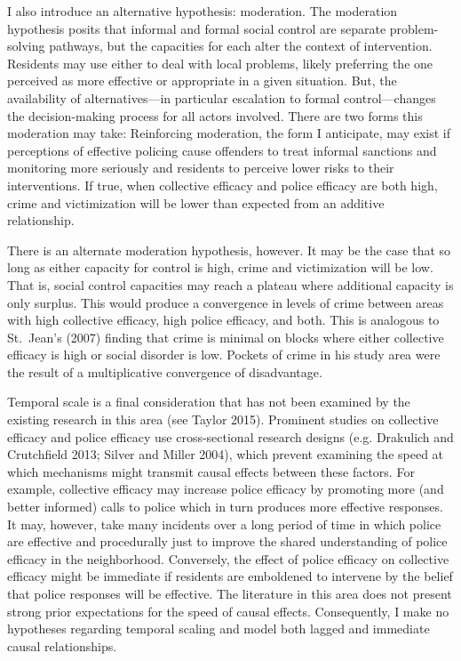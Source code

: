 \documentclass [11pt, proquest] {uwthesis}[2015/03/03]
\begin{document}
I also introduce an alternative hypothesis: moderation. The moderation hypothesis posits that informal and formal social control are separate problem-solving pathways, but the capacities for each alter the context of intervention. Residents may use either to deal with local problems, likely preferring the one perceived as more effective or appropriate in a given situation. But, the availability of alternatives---in particular escalation to formal control---changes the decision-making process for all actors involved. There are two forms this moderation may take: Reinforcing moderation, the form I anticipate, may exist if perceptions of effective policing cause offenders to treat informal sanctions and monitoring more seriously and residents to perceive lower risks to their interventions. If true, when collective efficacy and police efficacy are both high, crime and victimization will be lower than expected from an additive relationship.

There is an alternate moderation hypothesis, however. It may be the case that so long as either capacity for control is high, crime and victimization will be low. That is, social control capacities may reach a plateau where additional capacity is only surplus. This would produce a convergence in levels of crime between areas with high collective efficacy, high police efficacy, and both. This is analogous to St.~Jean's (2007) finding that crime is minimal on blocks where either collective efficacy is high or social disorder is low. Pockets of crime in his study area were the result of a multiplicative convergence of disadvantage.

Temporal scale is a final consideration that has not been examined by the existing research in this area (see Taylor 2015). Prominent studies on collective efficacy and police efficacy use cross-sectional research designs (e.g. Drakulich and Crutchfield 2013; Silver and Miller 2004), which prevent examining the speed at which mechanisms might transmit causal effects between these factors. For example, collective efficacy may increase police efficacy by promoting more (and better informed) calls to police which in turn produces more effective responses. It may, however, take many incidents over a long period of time in which police are effective and procedurally just to improve the shared understanding of police efficacy in the neighborhood. Conversely, the effect of police efficacy on collective efficacy might be immediate if residents are emboldened to intervene by the belief that police responses will be effective. The literature in this area does not present strong prior expectations for the speed of causal effects. Consequently, I make no hypotheses regarding temporal scaling and model both lagged and immediate causal relationships.
\end{document}

